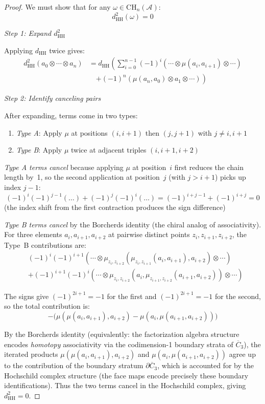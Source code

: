 \begin{proof}
We must show that for any $\omega \in \text{CH}_n(\mathcal{A})$:
\[d_{\text{HH}}^2(\omega) = 0\]

\emph{Step 1: Expand $d_{\text{HH}}^2$}

Applying $d_{\text{HH}}$ twice gives:
\begin{align*}
d_{\text{HH}}^2(a_0 \otimes \cdots \otimes a_n) 
&= d_{\text{HH}}\left(\sum_{i=0}^{n-1} (-1)^i (\cdots \otimes \mu(a_i, a_{i+1}) 
   \otimes \cdots)\right. \\
&\quad\left. + (-1)^n (\mu(a_n, a_0) \otimes a_1 \otimes \cdots)\right)
\end{align*}

\emph{Step 2: Identify canceling pairs}

After expanding, terms come in two types:
\begin{enumerate}
\item \emph{Type A}: Apply $\mu$ at positions $(i,i+1)$ then $(j,j+1)$ with $j \neq i, i+1$
\item \emph{Type B}: Apply $\mu$ twice at adjacent triples $(i,i+1,i+2)$
\end{enumerate}

\emph{Type A terms cancel} because applying $\mu$ at position~$i$ first reduces the chain length by~1, so the second application at position~$j$ (with $j > i+1$) picks up index $j-1$:
\[(-1)^i (-1)^{j-1} (\ldots) +
   (-1)^j (-1)^{i} (\ldots) = (-1)^{i+j-1} + (-1)^{i+j} = 0\]
(the index shift from the first contraction produces the sign difference)

\emph{Type B terms cancel} by the Borcherds identity (the chiral analog of associativity).
For three elements $a_i, a_{i+1}, a_{i+2}$ at pairwise distinct points $z_i, z_{i+1}, z_{i+2}$,
the Type~B contributions are:
\begin{align*}
&(-1)^i(-1)^{i+1}(\cdots \otimes \mu_{z_i, z_{i+2}}(\mu_{z_i, z_{i+1}}(a_i,a_{i+1}),a_{i+2}) \otimes \cdots) \\
&+ (-1)^{i+1}(-1)^i (\cdots \otimes \mu_{z_i, z_{i+2}}(a_i,\mu_{z_{i+1}, z_{i+2}}(a_{i+1},a_{i+2})) \otimes \cdots)
\end{align*}

The signs give $(-1)^{2i+1} = -1$ for the first and $(-1)^{2i+1} = -1$ for the second,
so the total contribution is:
\[-\bigl(\mu(\mu(a_i,a_{i+1}),a_{i+2}) - \mu(a_i,\mu(a_{i+1},a_{i+2}))\bigr)\]

By the Borcherds identity \cite[Section~3.4.7]{BD04}
(equivalently: the factorization algebra structure
encodes \emph{homotopy} associativity via the codimension-1 boundary strata
of $\overline{C}_3$), the iterated products
$\mu(\mu(a_i,a_{i+1}),a_{i+2})$ and $\mu(a_i,\mu(a_{i+1},a_{i+2}))$
agree up to the contribution of the boundary stratum $\partial \overline{C}_3$,
which is accounted for by the Hochschild complex structure
(the face maps encode precisely these boundary identifications).
Thus the two terms cancel in the Hochschild complex, giving $d_{\text{HH}}^2 = 0$.


\end{proof}

